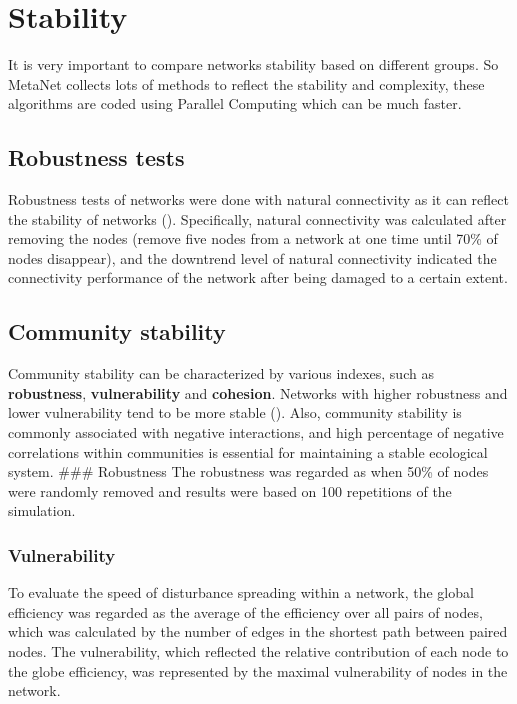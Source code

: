 \documentclass[
]{book}
\begin{document}
\hypertarget{stability}{%
\chapter{Stability}\label{stability}}

It is very important to compare networks stability based on different groups. So MetaNet collects lots of methods to reflect the stability and complexity, these algorithms are coded using Parallel Computing which can be much faster.

\hypertarget{robustness-tests}{%
\section{Robustness tests}\label{robustness-tests}}

Robustness tests of networks were done with natural connectivity as it can reflect the stability of networks (\citet{wujunNaturalConnectivityComplex2010}). Specifically, natural connectivity was calculated after removing the nodes (remove five nodes from a network at one time until 70\% of nodes disappear), and the downtrend level of natural connectivity indicated the connectivity performance of the network after being damaged to a certain extent.

\hypertarget{community-stability}{%
\section{Community stability}\label{community-stability}}

Community stability can be characterized by various indexes, such as \textbf{robustness}, \textbf{vulnerability} and \textbf{cohesion}. Networks with higher robustness and lower vulnerability tend to be more stable (\citet{yuanClimateWarmingEnhances2021}).
Also, community stability is commonly associated with negative interactions, and high percentage of negative correlations within communities is essential for maintaining a stable ecological system.
\#\#\# Robustness
The robustness was regarded as when 50\% of nodes were randomly removed and results were based on 100 repetitions of the simulation.

\hypertarget{vulnerability}{%
\subsection{Vulnerability}\label{vulnerability}}

To evaluate the speed of disturbance spreading within a network, the global efficiency was regarded as the average of the efficiency over all pairs of nodes, which was calculated by the number of edges in the shortest path between paired nodes. The vulnerability, which reflected the relative contribution of each node to the globe efficiency, was represented by the maximal vulnerability of nodes in the network.
\end{document}
